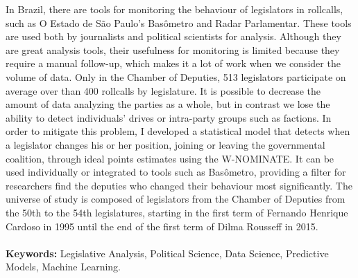 In Brazil, there are tools for monitoring the behaviour of legislators in
rollcalls, such as O Estado de São Paulo's Basômetro and Radar Parlamentar.
These tools are used both by journalists and political scientists for analysis.
Although they are great analysis tools, their usefulness for monitoring is
limited because they require a manual follow-up, which makes it a lot of work
when we consider the volume of data. Only in the Chamber of Deputies, 513
legislators participate on average over than 400 rollcalls by legislature. It
is possible to decrease the amount of data analyzing the parties as a whole,
but in contrast we lose the ability to detect individuals' drives or
intra-party groups such as factions.
In order to mitigate this problem, I developed a statistical model that detects
when a legislator changes his or her position, joining or leaving the
governmental coalition, through ideal points estimates using the W-NOMINATE. It
can be used individually or integrated to tools such as Basômetro, providing a
filter for researchers find the deputies who changed their behaviour most
significantly.
The universe of study is composed of legislators from the Chamber of Deputies
from the 50th to the 54th legislatures, starting in the first term of Fernando
Henrique Cardoso in 1995 until the end of the first term of Dilma Rousseff in
2015.
\\
\\
\textbf{Keywords:} Legislative Analysis, Political Science, Data Science,
Predictive Models, Machine Learning.
